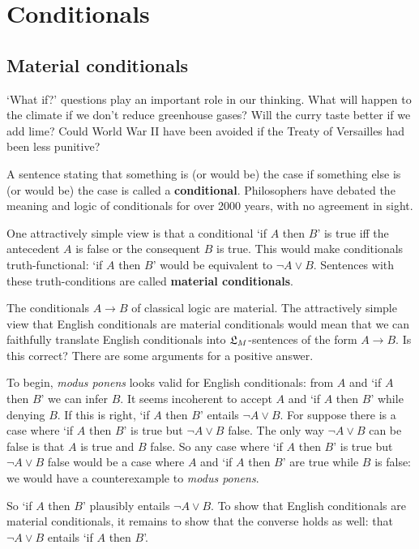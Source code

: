 \chapter{Conditionals}\label{ch:conditionals}

\section{Material conditionals}\label{sec:material}

`What if?' questions play an important role in our thinking. What will happen to
the climate if we don't reduce greenhouse gases? Will the curry taste better if
we add lime? Could World War II have been avoided if the Treaty of Versailles
had been less punitive?

A sentence stating that something is (or would be) the case if something else is
(or would be) the case is called a \textbf{conditional}. Philosophers have
debated the meaning and logic of conditionals for over 2000 years, with no
agreement in sight.

One attractively simple view is that a conditional `if $A$ then $B$' is true iff
the antecedent $A$ is false or the consequent $B$ is true. This would make
conditionals truth-functional: `if $A$ then $B$' would be equivalent to
$\neg A \lor B$. Sentences with these truth-conditions are called
\textbf{material conditionals}.

The conditionals $A \to B$ of classical logic are material. The attractively
simple view that English conditionals are material conditionals would mean that
we can faithfully translate English conditionals into $\mathfrak{L}_{M}$-sentences of the
form $A \to B$. Is this correct? There are some arguments for a positive answer.

To begin, \emph{modus ponens} looks valid for English conditionals: from $A$ and `if
$A$ then $B$' we can infer $B$. It seems incoherent to accept $A$ and `if $A$
then $B$' while denying $B$. If this is right, `if $A$ then $B$' entails
$\neg A \lor B$. For suppose there is a case where `if $A$ then $B$' is true
but $\neg A \lor B$ false. The only way $\neg A \lor B$ can be false is that $A$
is true and $B$ false. So any case where `if $A$ then $B$' is true but
$\neg A \lor B$ false would be a case where $A$ and `if $A$ then $B$' are true
while $B$ is false: we would have a counterexample to \emph{modus ponens}.

So `if $A$ then $B$' plausibly entails $\neg A \lor B$. To show that English
conditionals are material conditionals, it remains to show that the converse holds as
well: that $\neg A \lor B$ entails `if $A$ then $B$'.

